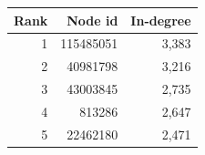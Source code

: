 \begin{tabular}{rrr}
\toprule
Rank & Node id & In-degree \\
\midrule
1 & 115485051 & 3,383 \\
2 & 40981798 & 3,216 \\
3 & 43003845 & 2,735 \\
4 & 813286 & 2,647 \\
5 & 22462180 & 2,471 \\
\bottomrule
\end{tabular}
